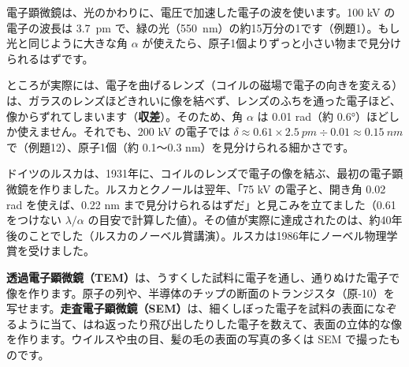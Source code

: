 電子顕微鏡は、光のかわりに、電圧で加速した電子の波を使います。100 kV の電子の波長は \qty{3.7}{pm} で、緑の光（\qty{550}{nm}）の約15万分の1です（例題1）。もし光と同じように大きな角 $\alpha$ が使えたら、原子1個よりずっと小さい物まで見分けられるはずです。

ところが実際には、電子を曲げるレンズ（コイルの磁場で電子の向きを変える）は、ガラスのレンズほどきれいに像を結べず、レンズのふちを通った電子ほど、像からずれてしまいます（\textbf{収差}）。そのため、角 $\alpha$ は 0.01 rad（約 0.6°）ほどしか使えません。それでも、200 kV の電子では $\delta\approx0.61\times\qty{2.5}{pm}\div0.01\approx\qty{0.15}{nm}$ で（例題12）、原子1個（約 0.1〜0.3 nm）を見分けられる細かさです。

\begin{bkfigure}
\label{ph:原-3:fig-scale}
\end{bkfigure}

ドイツのルスカは、1931年に、コイルのレンズで電子の像を結ぶ、最初の電子顕微鏡を作りました。ルスカとクノールは翌年、「75 kV の電子と、開き角 0.02 rad を使えば、0.22 nm まで見分けられるはずだ」と見こみを立てました（0.61 をつけない $\lambda/\alpha$ の目安で計算した値）。その値が実際に達成されたのは、約40年後のことでした（ルスカのノーベル賞講演）。ルスカは1986年にノーベル物理学賞を受けました。

\begin{phmijika}[電子顕微鏡で見ているもの]
\textbf{透過電子顕微鏡（TEM）}は、うすくした試料に電子を通し、通りぬけた電子で像を作ります。原子の列や、半導体のチップの断面のトランジスタ（原-10）を写せます。\textbf{走査電子顕微鏡（SEM）}は、細くしぼった電子を試料の表面になぞるように当て、はね返ったり飛び出したりした電子を数えて、表面の立体的な像を作ります。ウイルスや虫の目、髪の毛の表面の写真の多くは SEM で撮ったものです。
\end{phmijika}

